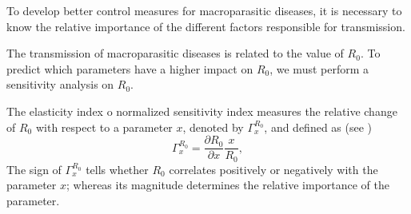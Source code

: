 \documentclass[eng]{MMSB-class-eng}
\begin{document}
	{\color{red}
	
	To develop better control measures for macroparasitic diseases, it is necessary to know the relative importance of the different factors responsible for transmission.
	
	The transmission of macroparasitic diseases is related to the value of $R_0$. To predict which parameters have a higher impact on $R_0$, we must perform a sensitivity analysis on $R_0$.	
	
	The elasticity index o normalized sensitivity index measures the relative change of $R_0$ with respect to a parameter $x$, denoted by $\Gamma^{R_0}_{x}$, and defined as (see \citet{van2017reproduction})
	\begin{equation}
	\Gamma^{R_0}_{x}=\dfrac{\partial R_0}{\partial x} \dfrac{x}{R_0},
	\end{equation}
	The sign of $\Gamma^{R_0}_{x}$ tells whether $R_0$ correlates positively or negatively  with the  parameter $x$; whereas its magnitude determines the relative importance of the parameter.
	
}
\end{document}

